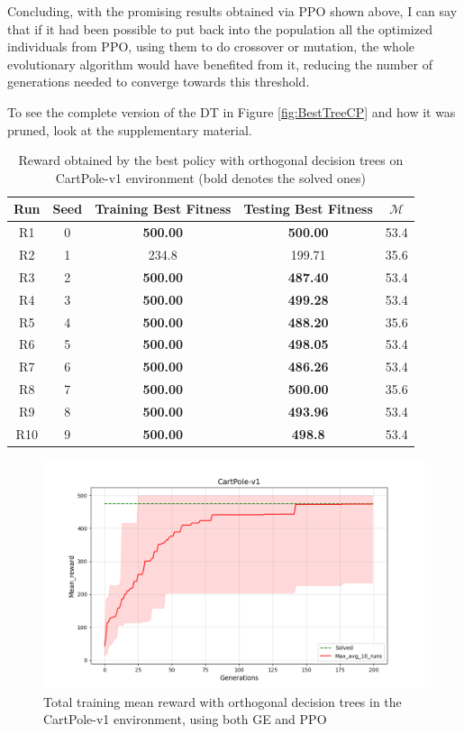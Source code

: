 Concluding, with the promising results obtained via PPO shown above, I can say that if it had been possible to put back into the population all the optimized individuals from PPO, using them to do crossover or mutation, the whole evolutionary algorithm would have benefited from it, reducing the number of generations needed to converge towards this threshold.

To see the complete version of the DT in Figure \ref{fig:BestTreeCP} and how it was pruned, look at the supplementary material.
\vspace{0.3in}

\begin{table}[h!]
\begin{center}
\begin{tabular}{ |c|c|c|c|c| } 
\hline
\textbf{Run} & \textbf{Seed} & \textbf{Training Best Fitness} & \textbf{Testing Best Fitness} & $\mathcal{M}$\\
\hline
R1 & 0 & \textbf{500.00} & \textbf{500.00} & 53.4\\
R2 & 1 & 234.8 & 199.71 & 35.6\\
R3 & 2 & \textbf{500.00} & \textbf{487.40} & 53.4\\
R4 & 3 & \textbf{500.00} & \textbf{499.28} & 53.4\\
R5 & 4 & \textbf{500.00} & \textbf{488.20} & 35.6\\
R6 & 5 & \textbf{500.00} & \textbf{498.05} & 53.4\\
R7 & 6 & \textbf{500.00} & \textbf{486.26} & 53.4\\
R8 & 7 & \textbf{500.00} & \textbf{500.00} & 35.6\\
R9 & 8 & \textbf{500.00} & \textbf{493.96} & 53.4\\
R10 & 9 & \textbf{500.00} & \textbf{498.8} & 53.4\\
\hline
\end{tabular}
\caption{Reward obtained by the best policy with orthogonal decision trees on CartPole-v1 environment (bold denotes the solved ones)}
\label{table:scoreCP}
\end{center}
\end{table}

\begin{figure}[h!]
    \centering
    \includegraphics[width=1\linewidth]{images/CartPole/CartPole10run.png}
    \caption{Total training mean reward with orthogonal decision trees in the CartPole-v1 environment, using both GE and PPO}
    \label{fig:CartPoleMean}
\end{figure}


